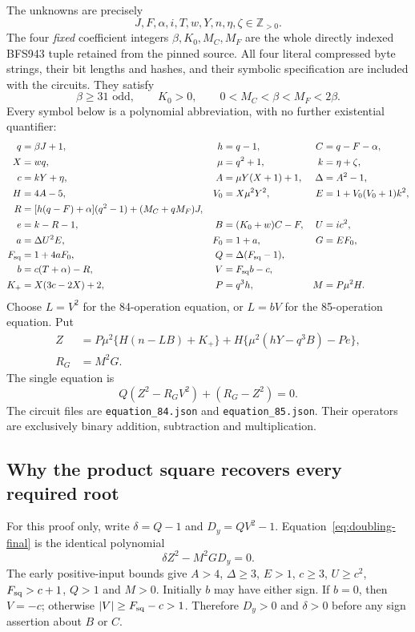 The unknowns are precisely
\[
 J,F,\alpha,i,T,w,Y,n,\eta,\zeta\in\mathbb Z_{>0}.
\]
The four \emph{fixed} coefficient integers $\beta,K_0,M_C,M_F$ are
the whole directly indexed BFS943 tuple retained from the pinned source.
All four literal compressed byte strings, their bit lengths and hashes,
and their symbolic specification are included with the circuits.  They
satisfy
\[
 \beta\ge31\text{ odd},\qquad K_0>0,\qquad
 0<M_C<\beta<M_F<2\beta.
\]
Every symbol below is a polynomial abbreviation, with no further
existential quantifier:
\begin{align*}
 q&=\beta J+1,&h&=q-1,&C&=q-F-\alpha,\\
 X&=wq,&\mu&=q^2+1,&k&=\eta+\zeta,\\
 c&=kY+\eta,&A&=\mu Y(X+1)+1,&\Delta&=A^2-1,\\
 H&=4A-5,&V_0&=X\mu^2Y^2,&E&=1+V_0(V_0+1)k^2,\\
 R&=[h(q-F)+\alpha](q^2-1)+(M_C+qM_F)J,\\
 e&=k-R-1,&B&=(K_0+w)C-F,&U&=ic^2,\\
 a&=\Delta U^2E,&F_0&=1+a,&G&=EF_0,\\
 F_{\rm sq}&=1+4aF_0,&Q&=\Delta(F_{\rm sq}-1),\\
 b&=c(T+\alpha)-R,&V&=F_{\rm sq}b-c,\\
 K_+&=X(3c-2X)+2,&P&=q^3h,&M&=P\mu^2H.
\end{align*}
Choose $L=V^2$ for the 84-operation equation, or $L=bV$ for the
85-operation equation.  Put
\begin{align*}
 Z&=P\mu^2\{H(n-LB)+K_+\}
       +H\{\mu^2(hY-q^3B)-Pe\},\\
 R_G&=M^2G.
\end{align*}
The single equation is
\begin{equation}
 \boxed{Q(Z^2-R_GV^2)+(R_G-Z^2)=0.}
 \label{eq:doubling-final}
\end{equation}
The circuit files are \texttt{equation\_84.json} and
\texttt{equation\_85.json}.  Their operators are exclusively binary
addition, subtraction and multiplication.

\subsection{Why the product square recovers every required root}

For this proof only, write $\delta=Q-1$ and $D_y=QV^2-1$.
Equation~\eqref{eq:doubling-final} is the identical polynomial
\begin{equation}
 \delta Z^2-M^2GD_y=0.
 \label{eq:doubling-product}
\end{equation}
The early positive-input bounds give $A>4$, $\Delta\ge3$, $E>1$,
$c\ge3$, $U\ge c^2$, $F_{\rm sq}>c+1$, $Q>1$ and $M>0$.
Initially $b$ may have either sign.  If $b=0$, then $V=-c$;
otherwise $|V|\ge F_{\rm sq}-c>1$.  Therefore $D_y>0$ and
$\delta>0$ before any sign assertion about $B$ or $C$.

